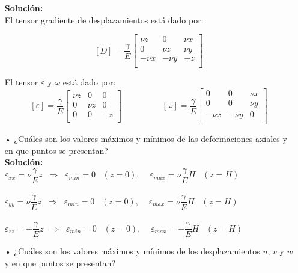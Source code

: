 \documentclass[../notas medios.tex]{subfiles}
\begin{document}
\begin{enumerate}
	\textbf{Solución:}\\
	
	El tensor gradiente de desplazamientos está dado por: 
	
	\[[D]
 	=   \dfrac{\gamma}{E}
 	\begin{bmatrix}
     	 \nu  z & 0 &  \nu  x\\
     	0 &  \nu  z &  \nu  y\\
     	- \nu x & - \nu  y &  - z\\
 	\end{bmatrix} \]
 	
 	El tensor  $\varepsilon$ y $\omega$ está dado por: 
 		\[[\varepsilon]
 	= \dfrac{\gamma}{E}
 	\begin{bmatrix}
     	 \nu  z & 0 &  0\\
     	0 &  \nu  z &  0\\
     	0 & 0 &  -  z\\
 	\end{bmatrix} 
 	\hspace{2cm}
 	[\omega]
 	= \dfrac{\gamma}{E}
 	\begin{bmatrix}
     	 0 & 0 &  \nu x\\
     	0 & 0 &  \nu y\\
     	- \nu x & - \nu  y &  0\\
 	\end{bmatrix} \]
	\item[•]¿Cuáles son los valores m\'aximos y m\'inimos de las deformaciones axiales y en que puntos se presentan? \\
		
	\textbf{Solución:} \\
	
$\varepsilon_{xx} =  \nu \dfrac{\gamma}{E} z  \;\; \Longrightarrow  \;\; \varepsilon_{min} = 0  \;\;\; (z=0),  \;\;\;\;  \varepsilon_{max} = \nu \dfrac{\gamma}{E} H \;\;\; (z=H) $\\\\
$\varepsilon_{yy} =  \nu \dfrac{\gamma}{E} z  \;\; \Longrightarrow  \;\; \varepsilon_{min} = 0  \;\;\; (z=0),  \;\;\;\;  \varepsilon_{max} = \nu \dfrac{\gamma}{E} H \;\;\; (z=H)$ \\\\
$\varepsilon_{zz} =  - \dfrac{\gamma}{E} z  \;\; \Longrightarrow  \;\; \varepsilon_{min} = 0  \;\;\; (z=0),  \;\;\;\;  \varepsilon_{max} = - \dfrac{\gamma}{E} H \;\;\; (z=H)$ \\
	\item[•] ¿Cuáles son los valores m\'aximos y m\'inimos de los desplazamientos $u$, $v$ y $w$ y en que puntos se presentan?
		


\end{enumerate}
\end{document}
